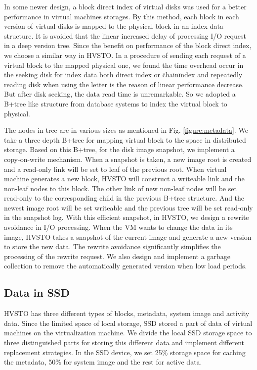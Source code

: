 \documentclass[conference]{IEEEtran}
\begin{document}
In some newer design, a block direct index of virtual disks was used for a better performance in virtual machines storages. By this method, each block in each version of virtual disks is mapped to the physical block in an index data structure. It is avoided that the linear increased delay of processing I/O request in a deep version tree. Since the benefit on performance of the block direct index, we choose a similar way in HVSTO. In a procedure of sending each request of a virtual block to the mapped physical one, we found the time overhead occur in the seeking disk for index data both direct index or \"chain\" index and repeatedly reading disk when using the letter is the reason of linear performance decrease. But after disk seeking, the data read time is unremarkable. So we adopted a B+tree like structure from database systems to index the virtual block to physical.

The nodes in tree are in various sizes as mentioned in Fig. \ref{figure:metadata}. We take a three depth B+tree for mapping virtual block to the space in distributed storage.
Based on this B+tree, for the disk image snapshot, we implement a copy-on-write mechanism. When a snapshot is taken, a new image root is created and a read-only link will be set to leaf of the previous root. When virtual machine generates a new block, HVSTO will construct a writeable link and the non-leaf nodes to this block. The other link of new non-leaf nodes will be set read-only to the corresponding child in the previous B+tree structure. And the newest image root will be set writeable and the previous tree will be set read-only in the snapshot log. With this efficient snapshot, in HVSTO, we design a rewrite avoidance in I/O processing. When the VM wants to change the data in its image, HVSTO takes a snapshot of the current image and generate a new version to store the new data. The rewrite avoidance significantly simplifies the processing of the rewrite request. We also design and implement a garbage collection to remove the automatically generated version when low load periods. 


\subsection{Data in SSD}
HVSTO has three different types of blocks, metadata, system image and activity data. Since the limited space of local storage, SSD stored a part of data of virtual machines on the virtualization machine. We divide the local SSD storage space to three distinguished parts for storing this different data and implement different replacement strategies. In the SSD device, we set 25\% storage space for caching the metadata, 50\% for system image and the rest for active data.
\end{document}
